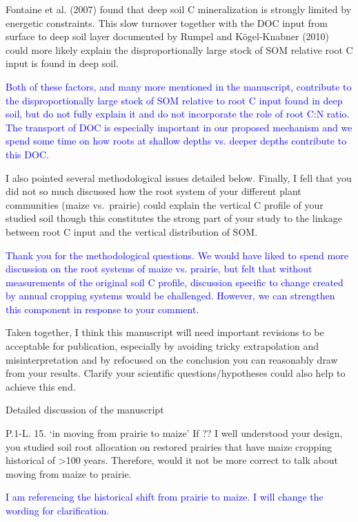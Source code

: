 \documentclass[]{article}
\begin{document}
Fontaine et al. (2007) found that deep soil C mineralization is strongly
limited by energetic constraints. This slow turnover together with the
DOC input from surface to deep soil layer documented by Rumpel and
Kögel-Knabner (2010) could more likely explain the disproportionally
large stock of SOM relative root C input is found in deep soil.

\textcolor{blue}{Both of these factors, and many more mentioned in the manuscript, contribute to the disproportionally large stock of SOM relative to root C input found in deep soil, but do not fully explain it and do not incorporate the role of root C:N ratio. The transport of DOC is especially important in our proposed mechanism and we spend some time on how roots at shallow depths vs. deeper depths contribute to this DOC.}

I also pointed several methodological issues detailed below. Finally, I
fell that you did not so much discussed how the root system of your
different plant communities (maize vs.~prairie) could explain the
vertical C profile of your studied soil though this constitutes the
strong part of your study to the linkage between root C input and the
vertical distribution of SOM.

\textcolor{blue}{Thank you for the methodological questions. We would have liked to spend more discussion on the root systems of maize vs. prairie, but felt that without measurements of the original soil C profile, discussion specific to change created by annual cropping systems would be challenged. However, we can strengthen this component in response to your comment.}

Taken together, I think this manuscript will need important revisions to
be acceptable for publication, especially by avoiding tricky
extrapolation and misinterpretation and by refocused on the conclusion
you can reasonably draw from your results. Clarify your scientific
questions/hypotheses could also help to achieve this end.

Detailed discussion of the manuscript

P.1-L. 15. `in moving from prairie to maize' If ?? I well understood
your design, you studied soil root allocation on restored prairies that
have maize cropping historical of \textgreater{}100 years. Therefore,
would it not be more correct to talk about moving from maize to prairie.

\textcolor{blue}{I am referencing the historical shift from prairie to maize. I will change the wording for clarification.}
\end{document}
